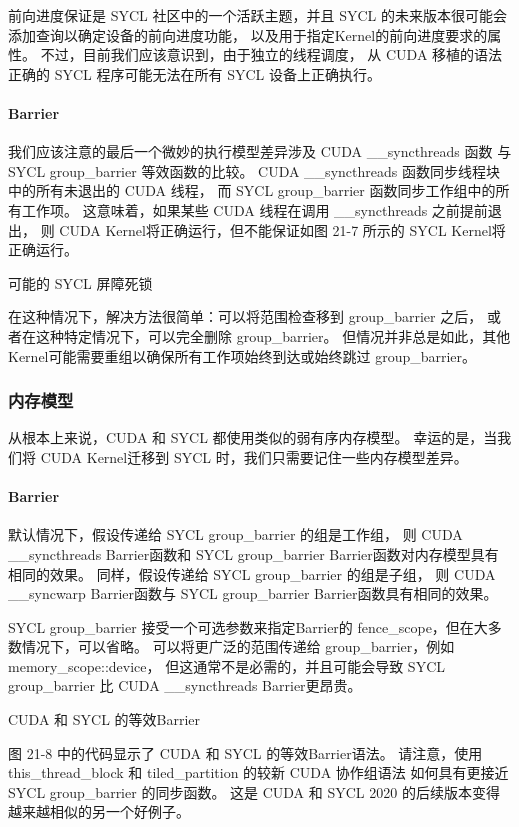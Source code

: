 前向进度保证是 SYCL 社区中的一个活跃主题，并且 SYCL 的未来版本很可能会添加查询以确定设备的前向进度功能，
以及用于指定Kernel的前向进度要求的属性。 不过，目前我们应该意识到，由于独立的线程调度，
从 CUDA 移植的语法正确的 SYCL 程序可能无法在所有 SYCL 设备上正确执行。

\paragraph{Barrier}

我们应该注意的最后一个微妙的执行模型差异涉及 CUDA \_\_syncthreads 函数
与 SYCL group\_barrier 等效函数的比较。 
CUDA \_\_syncthreads 函数同步线程块中的所有未退出的 CUDA 线程，
而 SYCL group\_barrier 函数同步工作组中的所有工作项。 
这意味着，如果某些 CUDA 线程在调用 \_\_syncthreads 之前提前退出，
则 CUDA Kernel将正确运行，但不能保证如图 21-7 所示的 SYCL Kernel将正确运行。

{\color{red} 可能的 SYCL 屏障死锁}

在这种情况下，解决方法很简单：可以将范围检查移到 group\_barrier 之后，
或者在这种特定情况下，可以完全删除 group\_barrier。 
但情况并非总是如此，其他Kernel可能需要重组以确保所有工作项始终到达或始终跳过 group\_barrier。

\subsubsection{内存模型}
从根本上来说，CUDA 和 SYCL 都使用类似的弱有序内存模型。 
幸运的是，当我们将 CUDA Kernel迁移到 SYCL 时，我们只需要记住一些内存模型差异。

\paragraph{Barrier}

默认情况下，假设传递给 SYCL group\_barrier 的组是工作组，
则 CUDA \_\_syncthreads Barrier函数和 SYCL group\_barrier Barrier函数对内存模型具有相同的效果。 
同样，假设传递给 SYCL group\_barrier 的组是子组，
则 CUDA \_\_syncwarp Barrier函数与 SYCL group\_barrier Barrier函数具有相同的效果。

SYCL group\_barrier 接受一个可选参数来指定Barrier的 fence\_scope，但在大多数情况下，可以省略。 
可以将更广泛的范围传递给 group\_barrier，例如 memory\_scope::device，
但这通常不是必需的，并且可能会导致 SYCL group\_barrier 比 CUDA \_\_syncthreads Barrier更昂贵。

{\color{red} CUDA 和 SYCL 的等效Barrier}

图 21-8 中的代码显示了 CUDA 和 SYCL 的等效Barrier语法。 
请注意，使用 this\_thread\_block 和 tiled\_partition 的较新 CUDA 协作组语法
如何具有更接近 SYCL group\_barrier 的同步函数。 
这是 CUDA 和 SYCL 2020 的后续版本变得越来越相似的另一个好例子。

